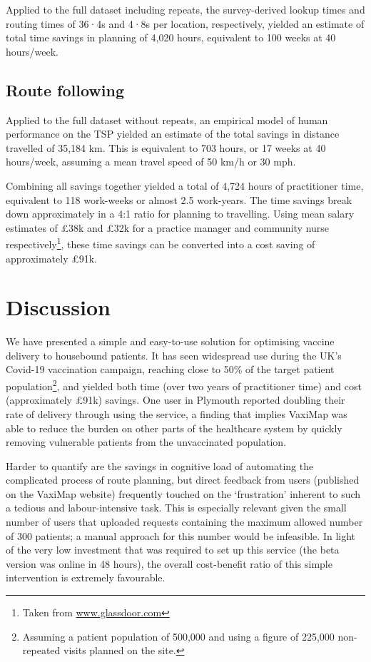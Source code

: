 \documentclass[review]{elsarticle}
\def\vm{VaxiMap}
\begin{document}
Applied to the full dataset including repeats, the survey-derived lookup times and routing times of 36·4s and 4·8s per location, respectively, yielded an estimate of total time savings in planning of 4,020 hours, equivalent to 100 weeks at 40 hours/week. 


\subsection{Route following}

Applied to the full dataset without repeats, an empirical model of human performance on the TSP yielded an estimate of the total savings in distance travelled of 35,184 km. This is equivalent to 703 hours, or 17 weeks at 40 hours/week, assuming a mean travel speed of 50 km/h or 30 mph. 

Combining all savings together yielded a total of 4,724 hours of practitioner time, equivalent to 118 work-weeks or almost 2.5 work-years. The time savings break down approximately in a 4:1 ratio for planning to travelling. Using mean salary estimates of £38k and £32k for a practice manager and community nurse respectively\footnote{Taken from \hyperlink{www.glassdoor.com}{www.glassdoor.com}}, these time savings can be converted into a cost saving of approximately £91k. 

\section{Discussion}

We have presented a simple and easy-to-use solution for optimising vaccine delivery to housebound patients. It has seen widespread use during the UK's Covid-19 vaccination campaign, reaching close to 50\% of the target patient population\footnote{Assuming a patient population of 500,000 and using a figure of 225,000 non-repeated visits planned on the site.}, and yielded both time (over two years of practitioner time) and cost (approximately £91k) savings. One user in Plymouth reported doubling their rate of delivery through using the service, a finding that implies \vm{} was able to reduce the burden on other parts of the healthcare system by quickly removing vulnerable patients from the unvaccinated population. 

Harder to quantify are the savings in cognitive load of automating the complicated process of route planning, but direct feedback from users (published on the \vm{} website) frequently touched on the `frustration' inherent to such a tedious and labour-intensive task. This is especially relevant given the small number of users that uploaded requests containing the maximum allowed number of 300 patients; a manual approach for this number would be infeasible. In light of the very low investment that was required to set up this service (the beta version was online in 48 hours), the overall cost-benefit ratio of this simple intervention is extremely favourable. 
\end{document}
